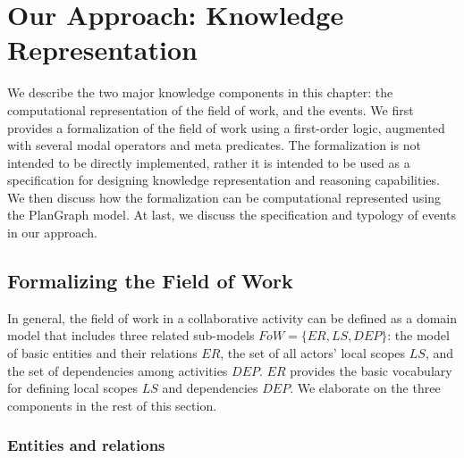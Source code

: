 \graphicspath{{Figures/}}

\chapter{Our Approach: Knowledge Representation} %
\label{cha:knowledge_reprsentation}
We describe the two major knowledge components in this chapter: the computational representation of the field of work, and the events. We first provides a formalization of the field of work using a first-order logic, augmented with several modal operators and meta predicates. The formalization is not intended to be directly implemented, rather it is intended to be used as a specification for designing knowledge representation and reasoning capabilities. We then discuss how the formalization can be computational represented using the PlanGraph model. At last, we discuss the specification and typology of events in our approach.

\section{Formalizing the Field of Work} %
\label{sec:formalizaing_the_field_of_work}
In general, the field of work in a collaborative activity can be defined as a domain model that includes three related sub-models $FoW=\{ER, LS, DEP\}$: the model of basic entities and their relations $ER$, the set of all actors' local scopes $LS$, and the set of dependencies among activities $DEP$. $ER$ provides the basic vocabulary for defining local scopes $LS$ and dependencies $DEP$. We elaborate on the three components in the rest of this section. 

\subsection{Entities and relations} %
\label{sub:entities_relations}
